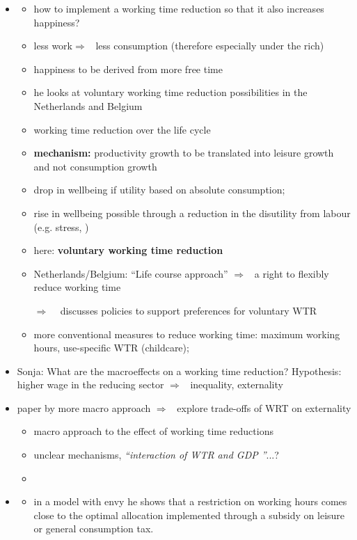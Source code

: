 \documentclass[12pt]{article}
\newcommand{\ar}{$\Rightarrow$ \ }
\begin{document}
\begin{itemize}
\item \cite{Pullinger2014WorkingDesign}
\begin{itemize}
\item how to implement a working time reduction so that it also increases happiness?
\item less work\ar less consumption (therefore especially under the rich)
\item happiness to be derived from more free time
\item he looks at voluntary working time reduction possibilities in the Netherlands and Belgium
\item working time reduction over the life cycle
\item \textbf{mechanism:} productivity growth to be translated into leisure growth and not consumption growth
\item drop in wellbeing if utility based on absolute consumption; 
\item rise in wellbeing possible through a reduction in the disutility from labour (e.g. stress, )
\item here: \textbf{voluntary working time reduction}
\item Netherlands/Belgium: ``Life course approach'' \ar a right to flexibly reduce working time
\item[\ar] discusses policies to support preferences for voluntary WTR
\item more conventional measures to reduce working time: 
maximum working hours, use-specific WTR (childcare); 
\end{itemize}
\item Sonja: What are the macroeffects on a working time reduction? Hypothesis: higher wage in the reducing sector \ar inequality, externality
\item paper by \cite{Cieplinski2021EnvironmentalReductionb} more macro approach \ar explore trade-offs of WRT on externality
\begin{itemize}
\item macro approach to the effect of working time reductions
\item unclear mechanisms, \textit{``interaction of WTR and GDP ''}...?
\item 
\end{itemize}
\item \cite{Alvarez-Cuadrado2007EnvyHours}
\begin{itemize}
\item in a model with envy he shows that a restriction on working hours comes close to the optimal allocation implemented through a subsidy on leisure or general consumption tax.

\end{itemize}
\end{itemize}
\end{document}
